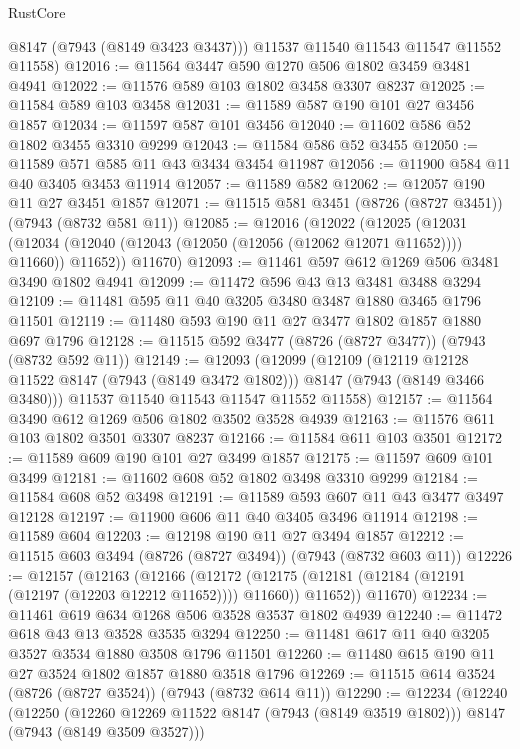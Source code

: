 \begin{lexlean}{RustCore}
\begin{coremodule}
        @8147
        (@7943 (@8149 @3423 @3437)))
      @11537
      @11540
      @11543
      @11547
      @11552
      @11558)
@12016 := @11564 @3447 @590 @1270 @506 @1802 @3459 @3481 @4941
@12022 := @11576 @589 @103 @1802 @3458 @3307 @8237
@12025 := @11584 @589 @103 @3458
@12031 := @11589 @587 @190 @101 @27 @3456 @1857
@12034 := @11597 @587 @101 @3456
@12040 := @11602 @586 @52 @1802 @3455 @3310 @9299
@12043 := @11584 @586 @52 @3455
@12050 := @11589 @571 @585 @11 @43 @3434 @3454 @11987
@12056 := @11900 @584 @11 @40 @3405 @3453 @11914
@12057 := @11589 @582
@12062 := @12057 @190 @11 @27 @3451 @1857
@12071 := @11515 @581 @3451 (@8726 (@8727 @3451)) (@7943 (@8732 @581 @11))
@12085 := @12016
    (@12022
      (@12025
        (@12031 (@12034 (@12040 (@12043 (@12050 (@12056 (@12062 @12071 @11652)))) @11660)) @11652))
      @11670)
@12093 := @11461 @597 @612 @1269 @506 @3481 @3490 @1802 @4941
@12099 := @11472 @596 @43 @13 @3481 @3488 @3294
@12109 := @11481 @595 @11 @40 @3205 @3480 @3487 @1880 @3465 @1796 @11501
@12119 := @11480 @593 @190 @11 @27 @3477 @1802 @1857 @1880 @697 @1796
@12128 := @11515 @592 @3477 (@8726 (@8727 @3477)) (@7943 (@8732 @592 @11))
@12149 := @12093
    (@12099
      (@12109
        (@12119 @12128 @11522 @8147 (@7943 (@8149 @3472 @1802)))
        @8147
        (@7943 (@8149 @3466 @3480)))
      @11537
      @11540
      @11543
      @11547
      @11552
      @11558)
@12157 := @11564 @3490 @612 @1269 @506 @1802 @3502 @3528 @4939
@12163 := @11576 @611 @103 @1802 @3501 @3307 @8237
@12166 := @11584 @611 @103 @3501
@12172 := @11589 @609 @190 @101 @27 @3499 @1857
@12175 := @11597 @609 @101 @3499
@12181 := @11602 @608 @52 @1802 @3498 @3310 @9299
@12184 := @11584 @608 @52 @3498
@12191 := @11589 @593 @607 @11 @43 @3477 @3497 @12128
@12197 := @11900 @606 @11 @40 @3405 @3496 @11914
@12198 := @11589 @604
@12203 := @12198 @190 @11 @27 @3494 @1857
@12212 := @11515 @603 @3494 (@8726 (@8727 @3494)) (@7943 (@8732 @603 @11))
@12226 := @12157
    (@12163
      (@12166
        (@12172 (@12175 (@12181 (@12184 (@12191 (@12197 (@12203 @12212 @11652)))) @11660)) @11652))
      @11670)
@12234 := @11461 @619 @634 @1268 @506 @3528 @3537 @1802 @4939
@12240 := @11472 @618 @43 @13 @3528 @3535 @3294
@12250 := @11481 @617 @11 @40 @3205 @3527 @3534 @1880 @3508 @1796 @11501
@12260 := @11480 @615 @190 @11 @27 @3524 @1802 @1857 @1880 @3518 @1796
@12269 := @11515 @614 @3524 (@8726 (@8727 @3524)) (@7943 (@8732 @614 @11))
@12290 := @12234
    (@12240
      (@12250
        (@12260 @12269 @11522 @8147 (@7943 (@8149 @3519 @1802)))
        @8147
        (@7943 (@8149 @3509 @3527)))

\end{coremodule}
\end{lexlean}
